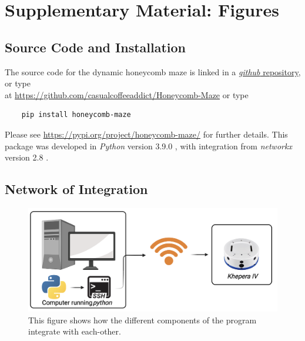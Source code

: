 

\newlength\myindent
\setlength\myindent{2em}
\newcommand\bindent{%
  \begingroup
  \setlength{\itemindent}{\myindent}
  \addtolength{\algorithmicindent}{\myindent}
}
\newcommand\eindent{\endgroup}



\appendix
\section{Supplementary Material: Figures}

\subsection{Source Code and Installation}

The source code for the dynamic honeycomb maze is linked in a  \href{https://github.com/casualcoffeeaddict/Honeycomb-Maze}{\textit{github} repository}, or type \\ at \href{https://github.com/casualcoffeeaddict/Honeycomb-Maze}{https://github.com/casualcoffeeaddict/Honeycomb-Maze} or type 
\begin{verbatim}
    pip install honeycomb-maze
\end{verbatim}
Please see \href{https://pypi.org/project/honeycomb-maze/}{https://pypi.org/project/honeycomb-maze/} for further details.
This package was developed in \textit{Python} version 3.9.0 \cite{python3}, with integration from \textit{networkx} version 2.8 \cite{networkx}.

\subsection{Network of Integration}
\label{fig:integration_network}
\begin{figure}[H]
    \centering
    \includegraphics[scale = 0.6]{images/intergration_netwwork.png}
    \caption{This figure shows how the different components of the program integrate with each-other.}

\end{figure}


